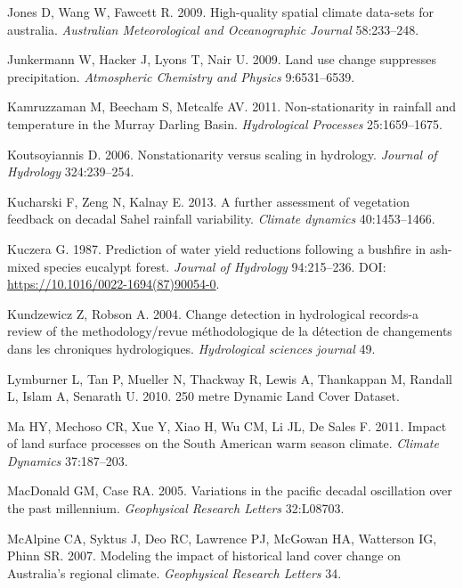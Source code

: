 \documentclass[fleqn,10pt,lineno]{wlpeerj} %
\theoremstyle{definition}
\theoremstyle{definition}
\theoremstyle{definition}
\theoremstyle{remark}
\begin{document}
\hypertarget{ref-Jones2009}{}
Jones D, Wang W, Fawcett R. 2009. High-quality spatial climate data-sets
for australia. \emph{Australian Meteorological and Oceanographic
Journal} 58:233--248.

\hypertarget{ref-Junkermann2009}{}
Junkermann W, Hacker J, Lyons T, Nair U. 2009. Land use change
suppresses precipitation. \emph{Atmospheric Chemistry and Physics}
9:6531--6539.

\hypertarget{ref-Kamruzzaman2011}{}
Kamruzzaman M, Beecham S, Metcalfe AV. 2011. Non-stationarity in
rainfall and temperature in the Murray Darling Basin. \emph{Hydrological
Processes} 25:1659--1675.

\hypertarget{ref-Koutsoyiannis2007}{}
Koutsoyiannis D. 2006. Nonstationarity versus scaling in hydrology.
\emph{Journal of Hydrology} 324:239--254.

\hypertarget{ref-kucharski_further_2013}{}
Kucharski F, Zeng N, Kalnay E. 2013. A further assessment of vegetation
feedback on decadal Sahel rainfall variability. \emph{Climate dynamics}
40:1453--1466.

\hypertarget{ref-Kuzcera1987}{}
Kuczera G. 1987. Prediction of water yield reductions following a
bushfire in ash-mixed species eucalypt forest. \emph{Journal of
Hydrology} 94:215--236. DOI:
\href{https://doi.org/https://10.1016/0022-1694(87)90054-0}{https://10.1016/0022-1694(87)90054-0}.

\hypertarget{ref-Kundzewicz2004}{}
Kundzewicz Z, Robson A. 2004. Change detection in hydrological records-a
review of the methodology/revue méthodologique de la détection de
changements dans les chroniques hydrologiques. \emph{Hydrological
sciences journal} 49.

\hypertarget{ref-Lymburner2010}{}
Lymburner L, Tan P, Mueller N, Thackway R, Lewis A, Thankappan M,
Randall L, Islam A, Senarath U. 2010. 250 metre Dynamic Land Cover
Dataset.

\hypertarget{ref-Ma2011}{}
Ma HY, Mechoso CR, Xue Y, Xiao H, Wu CM, Li JL, De Sales F. 2011. Impact
of land surface processes on the South American warm season climate.
\emph{Climate Dynamics} 37:187--203.

\hypertarget{ref-MacDonald2005}{}
MacDonald GM, Case RA. 2005. Variations in the pacific decadal
oscillation over the past millennium. \emph{Geophysical Research
Letters} 32:L08703.

\hypertarget{ref-McAlpine2007}{}
McAlpine CA, Syktus J, Deo RC, Lawrence PJ, McGowan HA, Watterson IG,
Phinn SR. 2007. Modeling the impact of historical land cover change on
Australia's regional climate. \emph{Geophysical Research Letters} 34.
\end{document}
